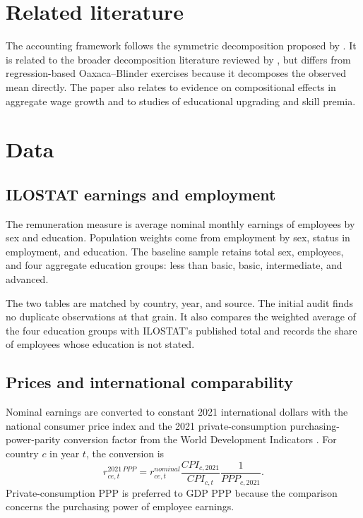 \documentclass[11pt]{article}
\begin{document}
\section{Related literature}

The accounting framework follows the symmetric decomposition proposed by
\citet{kitagawa1955}. It is related to the broader decomposition literature
reviewed by \citet{fortinlemieuxfirpo2011}, but differs from regression-based
Oaxaca--Blinder exercises because it decomposes the observed mean directly.
The paper also relates to evidence on compositional effects in aggregate wage
growth \citep{dalyhobijn2017,kouvavasetal2019} and to studies of educational
upgrading and skill premia.

\section{Data}

\subsection{ILOSTAT earnings and employment}

The remuneration measure is average nominal monthly earnings of employees by
sex and education. Population weights come from employment by sex, status in
employment, and education. The baseline sample retains total sex, employees,
and four aggregate education groups: less than basic, basic, intermediate, and
advanced.

The two tables are matched by country, year, and source. The initial audit
finds no duplicate observations at that grain. It also compares the weighted
average of the four education groups with ILOSTAT's published total and
records the share of employees whose education is not stated.

\subsection{Prices and international comparability}

Nominal earnings are converted to constant 2021 international dollars with
the national consumer price index and the 2021 private-consumption
purchasing-power-parity conversion factor from the World Development
Indicators \citep{worldbank2026wdi,worldbank2026cpi,worldbank2026ppp}. For
country \(c\) in year \(t\), the conversion is
\begin{equation}
  r_{ce,t}^{2021\,PPP}
  =
  r_{ce,t}^{nominal}
  \frac{CPI_{c,2021}}{CPI_{c,t}}
  \frac{1}{PPP_{c,2021}}.
  \label{eq:ppp_conversion}
\end{equation}
Private-consumption PPP is preferred to GDP PPP because the comparison
concerns the purchasing power of employee earnings.
\end{document}
